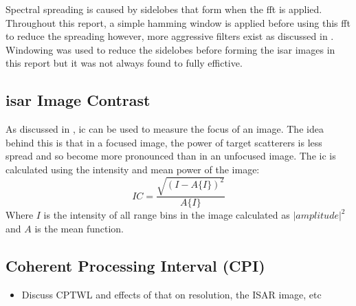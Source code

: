 \documentclass[class=report,11pt,crop=false]{standalone}
\begin{document}
    Spectral spreading is caused by sidelobes that form when the \gls{fft} is applied. Throughout this report, a simple hamming window is applied before using this \gls{fft} to reduce the spreading however, more aggressive filters exist as discussed in \cite{ISARtextbook_Martorella}. Windowing was used to reduce the sidelobes before forming the \gls{isar} images in this report but it was not always found to fully effictive.
    \subsection{\gls{isar} Image Contrast} %
    As discussed in \cite{image_contrast}, \gls{ic} can be used to measure the focus of an image. The idea behind this is that in a focused image, the power of target scatterers is less spread and so become more pronounced than in an unfocused image. The \gls{ic} is calculated using the intensity and mean power of the image:
    \begin{equation} \label{eq:image_contrast}
    IC = \frac{\sqrt{(I-A\{I\})^2}}{A\{I\}}
    \end{equation}
    Where \(I\) is the intensity of all range bins in the image calculated as \(|amplitude|^2\) and \(A\) is the mean function.
    
    \subsection{Coherent Processing Interval (CPI)}
    \begin{itemize}
        \item Discuss CPTWL and effects of that on resolution, the ISAR image, etc
    \end{itemize}



\ifstandalone

\printnoidxglossary[type=\acronymtype,nonumberlist]
\fi
\end{document}
